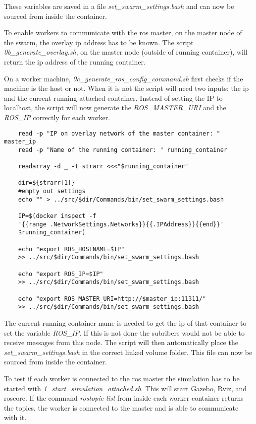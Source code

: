 These variables are saved in a file \textit{set\_swarm\_settings.bash} and can now be sourced from inside the container. 
\newpage

To enable workers to communicate with the \acs{ros} master, on the master node of the swarm, the overlay \acs{ip} address 
has to be known. The script \textit{0b\_generate\_overlay.sh}, on the master node
(outside of running container), will return the 
\acs{ip} address of the running container. 

On a worker machine, \textit{0c\_generate\_ros\_config\_command.sh} first checks if the machine is the host or not. When it 
is not the script will need two inputs; the \acs{ip} and the current running attached container. Instead of setting the IP to localhost, 
the script will now generate
the \textit{ROS\_MASTER\_URI} and the \textit{ROS\_IP} correctly for each worker.

\begin{verbatim}
    read -p "IP on overlay network of the master container: " master_ip
    read -p "Name of the running container: " running_container

    readarray -d _ -t strarr <<<"$running_container"

    dir=${strarr[1]}
    #empty out settings
    echo "" > ../src/$dir/Commands/bin/set_swarm_settings.bash 

    IP=$(docker inspect -f 
    '{{range .NetworkSettings.Networks}}{{.IPAddress}}{{end}}' 
    $running_container)
    
    echo "export ROS_HOSTNAME=$IP" 
    >> ../src/$dir/Commands/bin/set_swarm_settings.bash 

    echo "export ROS_IP=$IP" 
    >> ../src/$dir/Commands/bin/set_swarm_settings.bash  

    echo "export ROS_MASTER_URI=http://$master_ip:11311/" 
    >> ../src/$dir/Commands/bin/set_swarm_settings.bash
\end{verbatim}

The current running container name is needed to get the \acs{ip} of that container to set the variable \textit{ROS\_IP}. If this is not done 
the subribers would not be able to receive messages from this node.
The script will then automatically place the \textit{set\_swarm\_settings.bash} in the correct linked volume folder. This file can now be sourced
from inside the container.

To test if each worker is connected to the \acs{ros} master the simulation has to be 
started with \textit{1\_start\_simulation\_attached.sh}. This will start Gazebo, Rviz, and roscore. If the command 
\textit{rostopic list} from inside each worker container returns the topics, the worker is connected to the master 
and is able to communicate with it.